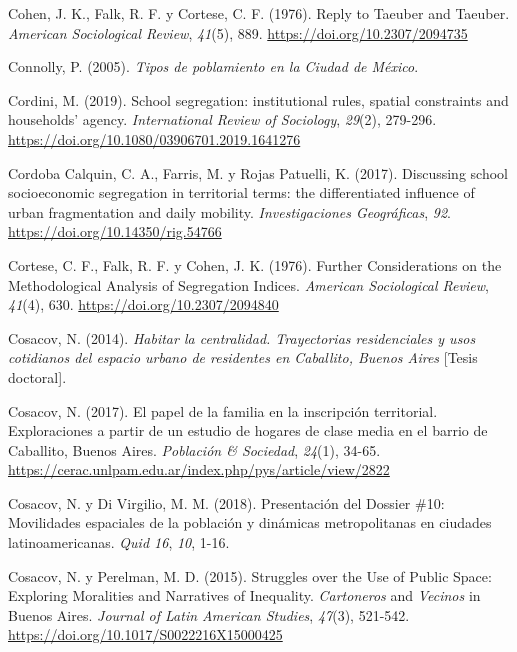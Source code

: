 \documentclass[
  spanish,
  a4paper,%
  chapterprefix=true,%
  DIV=calc,%
  twoside]{scrbook}%
\newlength{\cslhangindent}
\newenvironment{CSLReferences}[2] %
 {\begin{list}{}{%
  \setlength{\itemindent}{0pt}
  \setlength{\leftmargin}{0pt}
  \setlength{\parsep}{0pt}
  \ifodd #1
   \setlength{\leftmargin}{\cslhangindent}
   \setlength{\itemindent}{-1\cslhangindent}
  \fi
  \setlength{\itemsep}{#2\baselineskip}}}
 {\end{list}}
\begin{document}
\begin{CSLReferences}{1}{0}
Cohen, J. K., Falk, R. F. y Cortese, C. F. (1976). Reply to Taeuber and Taeuber. \emph{American Sociological Review}, \emph{41}(5), 889. \url{https://doi.org/10.2307/2094735}

Connolly, P. (2005). \emph{Tipos de poblamiento en la Ciudad de México}.

Cordini, M. (2019). School segregation: institutional rules, spatial constraints and households{'} agency. \emph{International Review of Sociology}, \emph{29}(2), 279-296. \url{https://doi.org/10.1080/03906701.2019.1641276}

Cordoba Calquin, C. A., Farris, M. y Rojas Patuelli, K. (2017). Discussing school socioeconomic segregation in territorial terms: the differentiated influence of urban fragmentation and daily mobility. \emph{Investigaciones Geográficas}, \emph{92}. \url{https://doi.org/10.14350/rig.54766}

Cortese, C. F., Falk, R. F. y Cohen, J. K. (1976). Further Considerations on the Methodological Analysis of Segregation Indices. \emph{American Sociological Review}, \emph{41}(4), 630. \url{https://doi.org/10.2307/2094840}

Cosacov, N. (2014). \emph{Habitar la centralidad. Trayectorias residenciales y usos cotidianos del espacio urbano de residentes en Caballito, Buenos Aires} {[}Tesis doctoral{]}.

Cosacov, N. (2017). El papel de la familia en la inscripción territorial. Exploraciones a partir de un estudio de hogares de clase media en el barrio de Caballito, Buenos Aires. \emph{Población \& Sociedad}, \emph{24}(1), 34-65. \url{https://cerac.unlpam.edu.ar/index.php/pys/article/view/2822}

Cosacov, N. y Di Virgilio, M. M. (2018). Presentación del Dossier {\#}10: Movilidades espaciales de la población y dinámicas metropolitanas en ciudades latinoamericanas. \emph{Quid 16}, \emph{10}, 1-16.

Cosacov, N. y Perelman, M. D. (2015). Struggles over the Use of Public Space: Exploring Moralities and Narratives of Inequality. {\emph{Cartoneros}} and {\emph{Vecinos}} in Buenos Aires. \emph{Journal of Latin American Studies}, \emph{47}(3), 521-542. \url{https://doi.org/10.1017/S0022216X15000425}


\end{CSLReferences}
\end{document}
